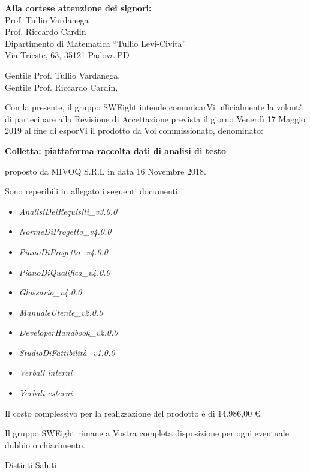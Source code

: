 \documentclass[11pt]{brownletter}
\date{Padova, 16 Maggio 2019} %
\newcommand{\AdR}{\emph{AnalisiDeiRequisiti\_v3.0.0}}
\newcommand{\NdP}{\emph{NormeDiProgetto\_v4.0.0}}
\newcommand{\PdP}{\emph{PianoDiProgetto\_v4.0.0}}
\newcommand{\PdQ}{\emph{PianoDiQualifica\_v4.0.0}}
\newcommand{\G}{\emph{Glossario\_v4.0.0}}
\newcommand{\MU}{\emph{ManualeUtente\_v2.0.0}}
\newcommand{\MS}{\emph{DeveloperHandbook\_v2.0.0}}
\newcommand{\SdFv}{\emph{StudioDiFattibilità\_v1.0.0}}
\begin{document}
\begin{letter}{\textbf{Alla cortese attenzione dei signori:}\\
	Prof. Tullio Vardanega\\
	Prof. Riccardo Cardin\\
	Dipartimento di Matematica “Tullio Levi-Civita”\\
	Via Trieste, 63, 35121 Padova PD}

\opening{	Gentile Prof. Tullio Vardanega,\\
			Gentile Prof. Riccardo Cardin,\\}

Con la presente, il gruppo SWEight intende comunicarVi ufficialmente la volontà di partecipare alla Revisione di Accettazione prevista il giorno Venerdì 17 Maggio 2019 al fine di esporVi il prodotto da Voi commissionato, denominato:
\begin{center}
	\textbf{Colletta: piattaforma raccolta dati di analisi di testo}
\end{center}
proposto da MIVOQ S.R.L in data 16 Novembre 2018.

Sono reperibili in allegato i seguenti documenti:
\begin{itemize}
	\item \AdR
	\item \NdP
	\item \PdP
	\item \PdQ
	\item \G
	\item \MU
	\item \MS
	\item \SdFv
	\item \emph{Verbali interni}
	\item \emph{Verbali esterni}
\end{itemize}
Il costo complessivo per la realizzazione del prodotto è di 14.986,00 \euro{}.

Il gruppo SWEight rimane a Vostra completa disposizione per ogni eventuale dubbio o chiarimento.
\closing{Distinti Saluti}

\end{letter}
\end{document}
